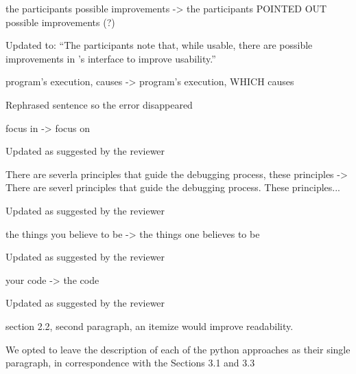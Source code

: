 \begin{remark}
the participants possible improvements -> the participants POINTED OUT possible improvements (?)
\end{remark}
\begin{solved}
Updated to: ``The participants note that, while usable, there are possible improvements in \flik's interface to improve usability.''
\end{solved}

\begin{remark}
program's execution, causes -> program's execution, WHICH causes
\end{remark}
\begin{solved}
Rephrased sentence so the error disappeared 
\end{solved}

\begin{remark}
focus in -> focus on
\end{remark}
\begin{solved}
Updated as suggested by the reviewer
\end{solved}

\begin{remark}
There are severla principles that guide the debugging process, these principles -> There are severl principles that guide the debugging process. These principles...
\end{remark}
\begin{solved}
Updated as suggested by the reviewer
\end{solved}

\begin{remark}
the things you believe to be -> the things one believes to be
\end{remark}
\begin{solved}
Updated as suggested by the reviewer
\end{solved}

\begin{remark}
your code -> the code
\end{remark}
\begin{solved}
Updated as suggested by the reviewer
\end{solved}

\begin{remark}
section 2.2, second paragraph, an itemize would improve readability.
\end{remark}
\begin{reconsider}
We opted to leave the description of each of the python approaches as their single paragraph, in correspondence with the Sections 3.1 and 3.3
\end{reconsider}

